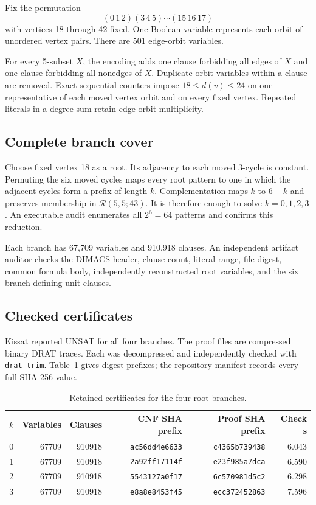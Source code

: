 \documentclass[11pt]{article}
\newcommand{\Rcal}{\mathcal{R}}
\begin{document}
Fix the permutation
\[
(0\,1\,2)(3\,4\,5)\cdots(15\,16\,17)
\]
with vertices 18 through 42 fixed. One Boolean variable represents each
orbit of unordered vertex pairs. There are 501 edge-orbit variables.

For every 5-subset $X$, the encoding adds one clause forbidding all edges of
$X$ and one clause forbidding all nonedges of $X$. Duplicate orbit variables
within a clause are removed. Exact sequential counters impose
$18\le d(v)\le24$ on one representative of each moved vertex orbit and on
every fixed vertex. Repeated literals in a degree sum retain edge-orbit
multiplicity.

\subsection{Complete branch cover}

Choose fixed vertex 18 as a root. Its adjacency to each moved 3-cycle is
constant. Permuting the six moved cycles maps every root pattern to one in
which the adjacent cycles form a prefix of length $k$. Complementation maps
$k$ to $6-k$ and preserves membership in $\Rcal(5,5;43)$. It is therefore
enough to solve $k=0,1,2,3$. An executable audit enumerates all $2^6=64$
patterns and confirms this reduction.

Each branch has 67,709 variables and 910,918 clauses. An independent artifact
auditor checks the DIMACS header, clause count, literal range, file digest,
common formula body, independently reconstructed root variables, and the six
branch-defining unit clauses.

\subsection{Checked certificates}

Kissat reported UNSAT for all four branches. The proof files are compressed
binary DRAT traces. Each was decompressed and independently checked with
\texttt{drat-trim}. Table~\ref{tab:certificates} gives digest prefixes; the
repository manifest records every full SHA-256 value.

\begin{table}[h]
\centering
\begin{tabular}{rrrrrr}
\toprule
$k$ & Variables & Clauses & CNF SHA prefix & Proof SHA prefix & Check s\\
\midrule
0 & 67709 & 910918 & \texttt{ac56dd4e6633} & \texttt{c4365b739438} & 6.043\\
1 & 67709 & 910918 & \texttt{2a92ff17114f} & \texttt{e23f985a7dca} & 6.590\\
2 & 67709 & 910918 & \texttt{5543127a0f17} & \texttt{6c570981d5c2} & 6.298\\
3 & 67709 & 910918 & \texttt{e8a8e8453f45} & \texttt{ecc372452863} & 7.596\\
\bottomrule
\end{tabular}
\caption{Retained certificates for the four root branches.}
\label{tab:certificates}
\end{table}
\end{document}
